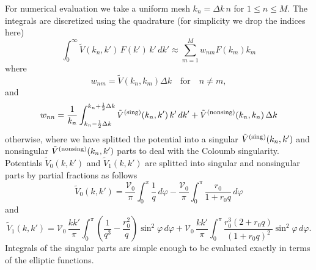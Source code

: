 \documentclass[
aps,
prl,
groupedaddress,
superscriptaddress,
floatfix,
notitlepage
]{revtex4-1}
\begin{document}
For numerical evaluation we take a uniform mesh $k_n=\Delta k\, n$ for $1\le n\le M$. 
The integrals are discretized using the quadrature (for simplicity we drop the indices here)
$$
\int_0^\infty \tilde{V}(k_n,k')\, F(k')\, k'\, dk'
\approx
\sum_{m=1}^{M} w_{nm} F(k_m)k_m
$$
where
$$
w_{nm}= \tilde{V}(k_n,k_m) \Delta k \quad\text{for}\quad n\neq m,
$$
and
$$
w_{nn}=\frac{1}{k_n}\int_{k_n-\frac12\Delta k}^{k_n+\frac12\Delta k}
\tilde{V}^{\rm (sing)}(k_n,k')\, k' \,dk' 
+ \tilde{V}^{\rm (nonsing)}(k_n,k_n) \, \Delta k
$$
otherwise, where we have splitted the potential into a singular $ \tilde{V}^{\rm (sing)}(k_n,k')$ and nonsingular  $\tilde{V}^{\rm (nonsing)}(k_n,k')$ parts to deal with the Coloumb singularity. Potentials $\tilde{V}_0(k,k')$ and $\tilde{V}_1(k,k')$ are splitted into singular and nonsingular parts by partial fractions as follows
\begin{equation*}
\tilde{V}_{0}(k,k') = \frac{\mathcal{V}_0}{\pi} \int_0^\pi \frac{1}{q}\,d\varphi
-
\frac{\mathcal{V}_0}{\pi} \int_0^\pi  \frac{r_0}{1+r_0q} \, d\varphi
\end{equation*}
and
\begin{equation*}
\tilde{V}_{1}(k,k') = \mathcal{V}_0\,\frac{kk'}{\pi} \int_0^\pi \left( \frac{1}{q^3} - \frac{r_0^2}{q}\right)\sin^2\varphi\,d\varphi
+
\mathcal{V}_0\,\frac{kk'}{\pi} \int_0^\pi  \frac{r_0^3 \left(2+r_0q\right)}{\left(1+r_0q\right)^2} \sin^2\varphi\, d\varphi.
\end{equation*}
Integrals of the singular parts are simple enough to be evaluated exactly in terms of the elliptic functions.





\end{document}
